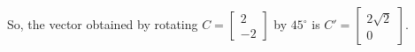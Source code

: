 \documentclass[11pt]{article}
\makeatletter
\newcommand{\boxspacing}{\kern\kvtcb@left@rule\kern\kvtcb@boxsep}
\newcommand{\prompt}[4]{
        {\ttfamily\llap{{\color{#2}[#3]:\hspace{3pt}#4}}\vspace{-\baselineskip}}
    }
\makeatother
\begin{document}
So, the vector obtained by rotating
$C = \begin{bmatrix} 2 \\ -2 \end{bmatrix}$ by $45^\circ$ is
$C' = \begin{bmatrix} 2\sqrt{2} \\ 0 \end{bmatrix}$.

    \begin{tcolorbox}[breakable, size=fbox, boxrule=1pt, pad at break*=1mm,colback=cellbackground, colframe=cellborder]
\prompt{In}{incolor}{ }{\boxspacing}
\begin{Verbatim}[commandchars=\\\{\}]

\end{Verbatim}
\end{tcolorbox}


    
    
    
\end{document}
